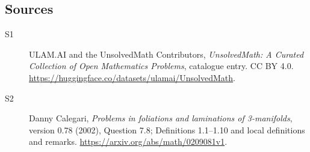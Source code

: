\documentclass[11pt]{article}
\begin{document}
\subsection{Sources}
\begin{description}
\item[\hypertarget{source:statement:1}{S1}] ULAM.AI and the UnsolvedMath Contributors, \emph{UnsolvedMath: A Curated Collection of Open Mathematics Problems}, catalogue entry. CC BY 4.0. \url{https://huggingface.co/datasets/ulamai/UnsolvedMath}.
\item[\hypertarget{source:statement:2}{S2}] Danny Calegari, \emph{Problems in foliations and laminations of 3-manifolds}, version 0.78 (2002), Question 7.8; Definitions 1.1--1.10 and local definitions and remarks. \url{https://arxiv.org/abs/math/0209081v1}.
\end{description}
\label{end:statement}
\end{document}
